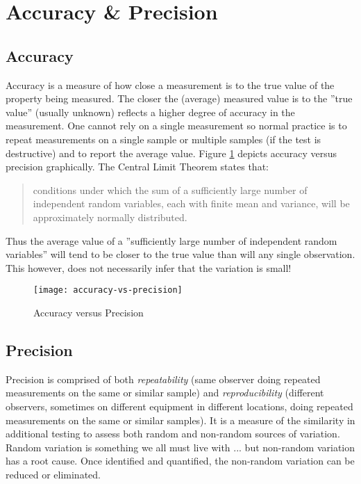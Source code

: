 \section{Accuracy \& Precision}
\subsection{Accuracy}
Accuracy is a measure of how close a measurement is to the true value of the property being measured.  The closer the (average) measured value is to the ''true value'' (usually unknown) reflects a higher degree of accuracy in the measurement.  One cannot rely on a single measurement so normal practice is to repeat measurements on a single sample or multiple samples (if the test is destructive) and to report the average value. Figure \ref{fig1} depicts accuracy versus precision graphically. The Central Limit Theorem states that:
\begin{quote}
conditions under which the sum of a sufficiently large number of independent random variables, each with finite mean and variance, will be approximately normally distributed.\cite{rice1995mathematical} 
\end{quote}
Thus the average value of a ''sufficiently large number of independent random variables'' will tend to be closer to the true value than will any single observation.  This however, does not necessarily infer that the variation is small!

\begin{figure}[h]\caption{Accuracy versus Precision}\label{fig1}
\begin{center}
\texttt{[image: accuracy-vs-precision]}
\end{center}
\end{figure}

\subsection{Precision}
Precision is comprised of both \textit{repeatability} (same observer doing repeated measurements on the same or similar sample) and \textit{reproducibility} (different observers, sometimes on different equipment in different locations, doing repeated measurements on the same or similar samples).  It is a measure of the similarity in additional testing to assess both random and non-random sources of variation.  Random variation is something we all must live with ... but non-random variation has a root cause.  Once identified and quantified, the non-random variation can be reduced or eliminated.


